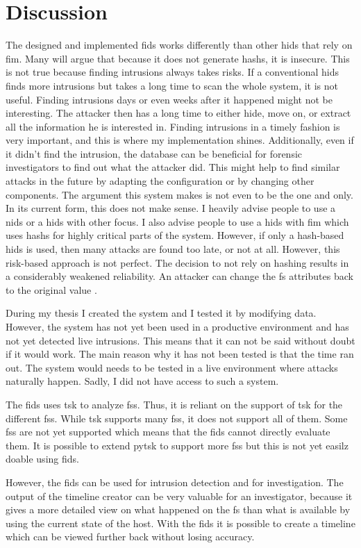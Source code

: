 
\chapter{Discussion}
\label{sec:Discussion}


The designed and implemented \gls{fids} works differently than other \gls{hids} that rely on \gls{fim}. Many will argue that because it does not generate \glspl{hash}, it is insecure. This is not true because finding \glspl{intrusion} always takes risks. If a conventional \gls{hids} finds more \glspl{intrusion} but takes a long time to scan the whole system, it is not useful. Finding \glspl{intrusion} days or even weeks after it happened might not be interesting. The attacker then has a long time to either hide, move on, or extract all the information he is interested in. Finding \glspl{intrusion} in a timely fashion is very important, and this is where my implementation shines. Additionally, even if it didn't find the \gls{intrusion}, the database can be beneficial for forensic investigators to find out what the attacker did. This might help to find similar attacks in the future by adapting the configuration or by changing other components. The argument this system makes is not even to be the one and only. In its current form, this does not make sense. I heavily advise people to use a \gls{nids} or a \gls{hids} with other focus. I also advise people to use a \gls{hids} with \gls{fim} which uses \glspl{hash} for highly critical parts of the system. However, if only a hash-based \gls{hids} is used, then many attacks are found too late, or not at all. However, this risk-based approach is not perfect. The decision to not rely on hashing results in a considerably weakened reliability. An attacker can change the \gls{fs} attributes back to the original value \cite{changing:attributes}. 

During my thesis I created the system and I tested it by modifying data. However, the system has not yet been used in a productive environment and has not yet detected live \glspl{intrusion}. This means that it can not be said without doubt if it would work. The main reason why it has not been tested is that the time ran out. The system would needs to be tested in a live environment where attacks naturally happen. Sadly, I did not have access to such a system. 

The \gls{fids} uses \gls{tsk} to analyze \glspl{fs}. Thus, it is reliant on the support of \gls{tsk} for the different \glspl{fs}. While \gls{tsk} supports many \glspl{fs}, it does not support all of them. Some \glspl{fs} are not yet supported which means that the \gls{fids} cannot directly evaluate them. It is possible to extend \gls{pytsk} to support more \glspl{fs} but this is not yet easilz doable using \gls{fids}. 

However, the \gls{fids} can be used for \gls{intrusion} detection and for investigation. The output of the timeline creator can be very valuable for an investigator, because it gives a more detailed view on what happened on the \gls{fs} than what is available by using the current state of the host. With the \gls{fids} it is possible to create a timeline which can be viewed further back without losing accuracy. 
